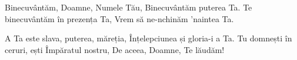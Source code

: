 \beginverse
Binecuvântăm, Doamne, Numele Tău,
Binecuvântăm puterea Ta.
Te binecuvântăm în prezența Ta,
Vrem să ne-nchinăm ’naintea Ta.
\endverse

\beginchorus
A Ta este slava, puterea, măreția,
Înțelepciunea și gloria-i a Ta.
Tu domnești în ceruri, ești Împăratul nostru,
De aceea, Doamne, Te lăudăm!
\endchorus
\endsong